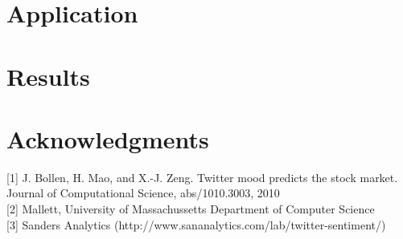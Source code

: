 \documentclass[letterpaper]{article}
\begin{document}
\section{Application}

\section{Results}


\section{ Acknowledgments}

[1] J. Bollen, H. Mao, and X.-J. Zeng. Twitter mood predicts the
stock market. Journal of Computational Science,
abs/1010.3003, 2010\\

[2] Mallett, University of Massachussetts Department of Computer Science\\

[3] Sanders Analytics (http://www.sananalytics.com/lab/twitter-sentiment/)
\end{document}
